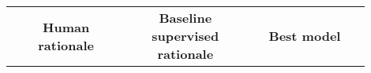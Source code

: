 

\begin{table*}[t]
\scriptsize
\centering

\begin{tabular}{@{}p{0.3\linewidth} p{0.3\linewidth} p{0.3\linewidth} @{}}
\toprule
\multicolumn{1}{c}{\textbf{Human rationale}}                                                                                                                                                                                                                                                                                                                                                                                                                                                                                                                                                                                                                                                                                                                                                                                                                                                                                                                                                                                                                                                                                                                                               & \multicolumn{1}{c}{\textbf{Baseline supervised rationale}}                                                                                                                                                                                                                                                                                                                                                                                                                                                                                                                                                                                                                                                                                                                                                                                                                                                                                                                                                                                                                                                                                                                                                                                            & \multicolumn{1}{c}{\textbf{Best model}}                                                                                                                                                                                                                                                                                                                                                                                                                                                                                                                                                                                                                            
\end{tabular}
\end{table*}
